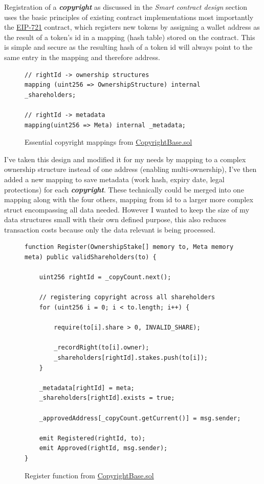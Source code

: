 \documentclass[12pt]{article}
\newcommand{\keyword}[1]{\textbf{\textit{#1}}}
\newcommand{\nft}[0]{\href{https://eips.ethereum.org/EIPS/eip-721}{EIP-721} }
\begin{document}
Registration of a \keyword{copyright} as discussed in the \textit{Smart contract design} section uses the basic principles of existing contract implementations most importantly the \nft contract, which registers new tokens by assigning a wallet address as the result of a token's id in a mapping (hash table) stored on the contract. This is simple and secure as the resulting hash of a token id will always point to the same entry in the mapping and therefore address.

\begin{figure}[H]
\caption{Essential copyright mappings from \href{https://github.com/MrHarrisonBarker/CRPL/blob/main/CRPL.Contracts/contracts/Copyrights/CopyrightBase.sol}{CopyrightBase.sol}}
\centering
\begin{lstlisting}[language=Solidity]
// rightId -> ownership structures
mapping (uint256 => OwnershipStructure) internal _shareholders;
    
// rightId -> metadata
mapping(uint256 => Meta) internal _metadata;
\end{lstlisting}
\end{figure}

I've taken this design and modified it for my needs by mapping to a complex ownership structure instead of one address (enabling multi-ownership), I've then added a new mapping to save metadata (work hash, expiry date, legal protections) for each \keyword{copyright}. These technically could be merged into one mapping along with the four others, mapping from id to a larger more complex struct encompassing all data needed. However I wanted to keep the size of my data structures small with their own defined purpose, this also reduces transaction costs because only the data relevant is being processed.

\begin{figure}[H]
\caption{Register function from \href{https://github.com/MrHarrisonBarker/CRPL/blob/main/CRPL.Contracts/contracts/Copyrights/CopyrightBase.sol}{CopyrightBase.sol}}
\centering
\begin{lstlisting}[language=Solidity]
function Register(OwnershipStake[] memory to, Meta memory meta) public validShareholders(to) {
	
	uint256 rightId = _copyCount.next();

	// registering copyright across all shareholders
	for (uint256 i = 0; i < to.length; i++) {

		require(to[i].share > 0, INVALID_SHARE);

		_recordRight(to[i].owner);
		_shareholders[rightId].stakes.push(to[i]);
	}
        
	_metadata[rightId] = meta;
	_shareholders[rightId].exists = true;
        
	_approvedAddress[_copyCount.getCurrent()] = msg.sender;

	emit Registered(rightId, to);
	emit Approved(rightId, msg.sender);
}	
\end{lstlisting}
\end{figure}
\end{document}
